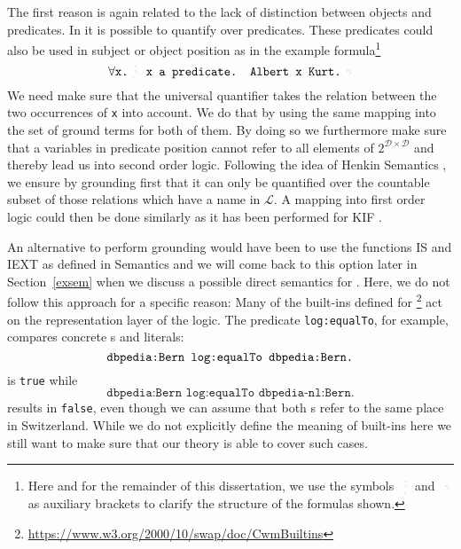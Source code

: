 The first reason is again related to the lack of distinction 
between objects and predicates. In \nthree it is possible to quantify over predicates. 
These predicates could also be used in subject or object position as in the example formula\footnote{Here and for the remainder of this dissertation, we use the symbols $\lhexbrace$ and $\rhexbrace$ as auxiliary brackets 
to clarify the structure of the formulas shown.}
\[
 \forall \texttt{x.}\lhexbrace\texttt{ x a predicate. Albert x Kurt.}\rhexbrace
\]
We need make sure that the universal quantifier takes the relation between the 
two occurrences of \texttt{x} into account. 
We do that by using the same mapping into the set of ground terms for both of them.
By doing so we furthermore make sure that a variables in predicate position cannot refer to all elements of $2^{\mathcal{D}\times\mathcal{D}}$ and thereby lead us into second order logic.
Following the idea of  Henkin Semantics \cite{henkin_1950}, we ensure by grounding first that it can only be quantified over 
the countable subset of those relations 
which have a name in $\mathcal{L}$. 
A mapping into first order logic could then be done similarly as it has been performed for KIF \cite{skif}. %

An alternative to perform grounding would have been to use the functions IS and IEXT as defined in \rdf Semantics \cite{RDFSemantics} and we will come back to this option later in 
Section~\ref{exsem} when we discuss a possible direct semantics for \nthree. 
Here, we do not follow this approach for a specific reason: %
%
Many of the built-ins defined 
for \nthreelogic\footnote{\url{https://www.w3.org/2000/10/swap/doc/CwmBuiltins}} 
act on the representation layer of the logic. The predicate \texttt{log:equalTo}, for example, 
compares concrete \uri{}s and literals:
\[
 \texttt{dbpedia:Bern log:equalTo \texttt{dbpedia:Bern}.} 
\]
is \texttt{true} while
\[
 \texttt{dbpedia:Bern log:equalTo dbpedia-nl:Bern.}
\]
results in \texttt{false}, even though we can assume that both \uri{}s refer to the same place in Switzerland.
While we do not explicitly define the meaning of built-ins here 
we still want to make sure that our theory is able to cover such cases.

